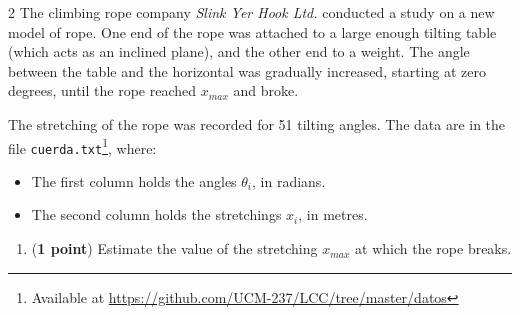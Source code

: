 \begin{paracol}{2}
 The climbing rope company \emph{Slink Yer Hook Ltd.} conducted a study on a new model of rope. One end of the rope was attached to a large enough tilting table (which acts as an inclined plane), and the other end to a weight. The angle between the table and the horizontal was gradually increased, starting at zero degrees, until the rope reached $x_{max}$ and broke.

The stretching of the rope was recorded for 51 tilting angles. The data are in the file \texttt{cuerda.txt}\footnote{Available at \url{https://github.com/UCM-237/LCC/tree/master/datos}}, where:

\begin{itemize}
	\item The first column holds the angles $\theta_i$, in radians.
	\item The second column holds the stretchings $x_i$, in metres.
\end{itemize}

\begin{enumerate}
	\item (\textbf{1 point}) Estimate the value of the stretching $x_{max}$ at which the rope breaks.


\end{enumerate}
\end{paracol}

